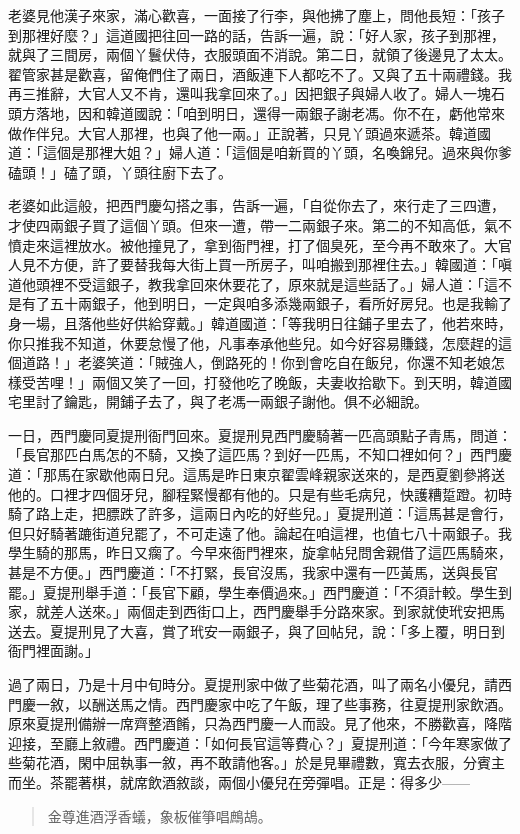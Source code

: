 老婆見他漢子來家，滿心歡喜，一面接了行李，與他拂了塵上，問他長短：「孩子到那裡好麼？」這道國把往回一路的話，告訴一遍，說：「好人家，孩子到那裡，就與了三間房，兩個丫鬟伏侍，衣服頭面不消說。第二日，就領了後邊見了太太。翟管家甚是歡喜，留俺們住了兩日，酒飯連下人都吃不了。又與了五十兩禮錢。我再三推辭，大官人又不肯，還叫我拿回來了。」因把銀子與婦人收了。婦人一塊石頭方落地，因和韓道國說：「咱到明日，還得一兩銀子謝老馮。你不在，虧他常來做作伴兒。大官人那裡，也與了他一兩。」正說著，只見丫頭過來遞茶。韓道國道：「這個是那裡大姐？」婦人道：「這個是咱新買的丫頭，名喚錦兒。過來與你爹磕頭！」磕了頭，丫頭往廚下去了。

老婆如此這般，把西門慶勾搭之事，告訴一遍，「自從你去了，來行走了三四遭，才使四兩銀子買了這個丫頭。但來一遭，帶一二兩銀子來。第二的不知高低，氣不憤走來這裡放水。被他撞見了，拿到衙門裡，打了個臭死，至今再不敢來了。大官人見不方便，許了要替我每大街上買一所房子，叫咱搬到那裡住去。」韓國道：「嗔道他頭裡不受這銀子，教我拿回來休要花了，原來就是這些話了。」婦人道：「這不是有了五十兩銀子，他到明日，一定與咱多添幾兩銀子，看所好房兒。也是我輸了身一場，且落他些好供給穿戴。」韓道國道：「等我明日往鋪子里去了，他若來時，你只推我不知道，休要怠慢了他，凡事奉承他些兒。如今好容易賺錢，怎麼趕的這個道路！」老婆笑道：「賊強人，倒路死的！你到會吃自在飯兒，你還不知老娘怎樣受苦哩！」兩個又笑了一回，打發他吃了晚飯，夫妻收拾歇下。到天明，韓道國宅里討了鑰匙，開鋪子去了，與了老馮一兩銀子謝他。俱不必細說。

一日，西門慶同夏提刑衙門回來。夏提刑見西門慶騎著一匹高頭點子青馬，問道：「長官那匹白馬怎的不騎，又換了這匹馬？到好一匹馬，不知口裡如何？」西門慶道：「那馬在家歇他兩日兒。這馬是昨日東京翟雲峰親家送來的，是西夏劉參將送他的。口裡才四個牙兒，腳程緊慢都有他的。只是有些毛病兒，快護糟踅蹬。初時騎了路上走，把膘跌了許多，這兩日內吃的好些兒。」夏提刑道：「這馬甚是會行，但只好騎著蹗街道兒罷了，不可走遠了他。論起在咱這裡，也值七八十兩銀子。我學生騎的那馬，昨日又瘸了。今早來衙門裡來，旋拿帖兒問舍親借了這匹馬騎來，甚是不方便。」西門慶道：「不打緊，長官沒馬，我家中還有一匹黃馬，送與長官罷。」夏提刑舉手道：「長官下顧，學生奉價過來。」西門慶道：「不須計較。學生到家，就差人送來。」兩個走到西街口上，西門慶舉手分路來家。到家就使玳安把馬送去。夏提刑見了大喜，賞了玳安一兩銀子，與了回帖兒，說：「多上覆，明日到衙門裡面謝。」

過了兩日，乃是十月中旬時分。夏提刑家中做了些菊花酒，叫了兩名小優兒，請西門慶一敘，以酬送馬之情。西門慶家中吃了午飯，理了些事務，往夏提刑家飲酒。原來夏提刑備辦一席齊整酒餚，只為西門慶一人而設。見了他來，不勝歡喜，降階迎接，至廳上敘禮。西門慶道：「如何長官這等費心？」夏提刑道：「今年寒家做了些菊花酒，閑中屈執事一敘，再不敢請他客。」於是見畢禮數，寬去衣服，分賓主而坐。茶罷著棋，就席飲酒敘談，兩個小優兒在旁彈唱。正是：得多少——
\begin{quote}
金尊進酒浮香蟻，象板催箏唱鷓鴣。
\end{quote}

